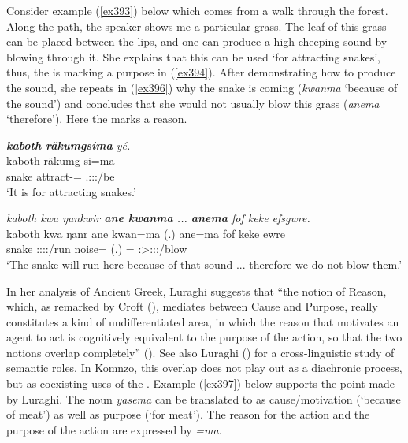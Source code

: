 Consider example (\ref{ex393}) below which comes from a walk through the forest. Along the path, the speaker shows me a particular grass. The leaf of this grass can be placed between the lips, and one can produce a high cheeping sound by blowing through it. She explains that this can be used `for attracting snakes', thus, the  is marking a purpose in (\ref{ex394}). After demonstrating how to produce the sound, she repeats in (\ref{ex396}) why the snake is coming (\emph{kwanma} `because of the sound') and concludes that she would not usually blow this grass (\emph{anema} `therefore'). Here the   marks a reason.

\begin{exe}
\ex
\label{ex393}
\begin{xlist}
 	\ex \emph{\textbf{kaboth räkumgsima} yé.}\\
 	\gll kaboth räkumg-si=ma \\
 	snake attract-\Nmlz=\Char{} \Tsg.\Masc:\Sbj:\Nonpast:\Ipfv/be\\ 
 	\trans `It is for attracting snakes.'
 	\label{ex394}

 	\ex \emph{kaboth kwa ŋankwir \textbf{ane kwanma} ... \textbf{anema} fof keke efsgwre.}\\
 	\gll kaboth kwa ŋanr ane kwan=ma (.) ane=ma fof keke ewre\\
 	snake \Fut{} \Stsg:\Sbj:\Nonpast:\Ipfv:\Venit/run \Dem{} noise=\Char{} (.) \Dem=\Char{} \Emph{} \Neg{} \Fpl:\Sbj>\Stpl:\Obj:\Nonpast:\Ipfv/blow\\
 	\trans `The snake will run here because of that sound ... therefore we do not blow them.'
 	\label{ex396}
\end{xlist}
\end{exe}

In her analysis of Ancient Greek, Luraghi suggests that ``the notion of Reason, which, as remarked by Croft (\citeyear{Croft:cogn}), mediates between Cause and Purpose, really constitutes a kind of undifferentiated area, in which the reason that motivates an agent to act is cognitively equivalent to the purpose of the action, so that the two notions overlap completely'' (\citeyear[46]{Luraghi:2003vi}). See also Luraghi (\citeyear{Luraghi:2001bv}) for a cross-linguistic study of semantic roles. In Komnzo, this overlap does not play out as a diachronic process, but as coexisting uses of the  . Example (\ref{ex397}) below supports the point made by Luraghi. The noun \emph{yasema} can be translated to  as cause/motivation (`because of meat') as well as purpose (`for meat'). The reason for the action and the purpose of the action are expressed by \emph{=ma}.

